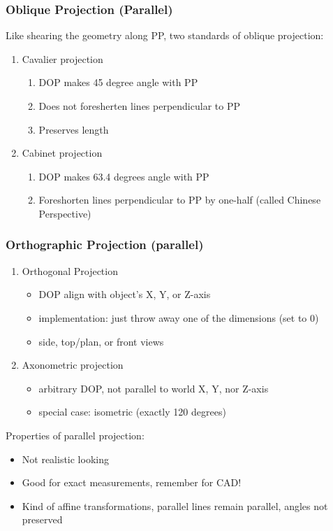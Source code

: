 \documentclass[11pt]{article}
\begin{document}
\subsubsection*{Oblique Projection (Parallel)}
Like shearing the geometry along PP, two standards of oblique projection:
\begin{enumerate}
    \item Cavalier projection \begin{enumerate}
        \item DOP makes 45 degree angle with PP
        \item Does not foresherten lines perpendicular to PP
        \item Preserves length
    \end{enumerate}
    \item Cabinet projection \begin{enumerate}
        \item DOP makes 63.4 degrees angle with PP
        \item Foreshorten lines perpendicular to PP by one-half (called Chinese Perspective)
    \end{enumerate} 
\end{enumerate}

\subsubsection*{Orthographic Projection (parallel)}
\begin{enumerate}
    \item Orthogonal Projection \begin{itemize}
        \item DOP align with object's X, Y, or Z-axis
        \item implementation: just throw away one of the dimensions (set to 0)
        \item side, top/plan, or front views
    \end{itemize}
    \item Axonometric projection \begin{itemize}
        \item arbitrary DOP, not parallel to world X, Y, nor Z-axis
        \item special case: isometric (exactly 120 degrees)
    \end{itemize}
\end{enumerate}

Properties of parallel projection: 
\begin{itemize}
    \item Not realistic looking
    \item Good for exact measurements, remember for CAD!
    \item Kind of affine transformations, parallel lines remain parallel, angles not preserved
\end{itemize}
\end{document}

